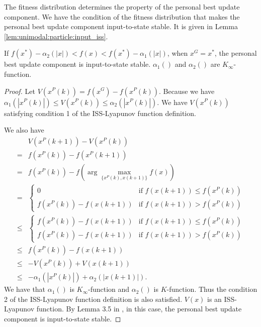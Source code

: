 The fitness distribution determines the property of the personal best update component.
We have the condition of the fitness distribution that makes the personal best update component input-to-state stable.
It is given in Lemma \ref{lem:unimodal:particle:input_iss}.

\begin{mylem}
\label{lem:unimodal:particle:input_iss}
If $ f(x^{*}) - \alpha_{2} ( |x| ) <  f(x) < f(x^{*}) - \alpha_{1} ( |x| ) $, when $ x^{G} = x^{*} $, the personal best update component is input-to-state stable.
$ \alpha_{1} () $ and $ \alpha_{2} () $ are $ K_{\infty} $-function.
\begin{proof}
Let $ V(x^{P}(k)) = f(x^{G}) - f(x^{P}(k)) $.
Because we have
$ \alpha_{1} ( |x^{P}(k)| ) \leq V( x^{P}(k) ) \leq \alpha_{2} ( |x^{P}(k)| )  $.
We have $ V ( x^{P}(k) ) $ satisfying condition 1 of the ISS-Lyapunov function definition.

We also have
\begin{equation}
\begin{aligned}
& V(x^{P}(k+1)) - V(x^{P}(k)) \\
= & f(x^{P} (k)) - f(x^{P} (k+1)) \\
= & f(x^{P}(k)) - f( \arg \max_{ \{ x^{P}(k), x(k+1)  \} } f(x) )  \\
= & 
\left\{\begin{matrix}
0  & \mbox{if } f(x(k+1)) \leq f(x^{P}(k)) \\ 
f(x^{P}(k)) - f(x(k+1)) & \mbox{if } f(x(k+1)) > f(x^{P}(k))
\end{matrix}\right. \\
\leq & 
\left\{\begin{matrix}
f(x^{P}(k)) - f(x(k+1))  & \mbox{if } f(x(k+1)) \leq f(x^{P}(k)) \\ 
f(x^{P}(k)) - f(x(k+1)) & \mbox{if } f(x(k+1)) > f(x^{P}(k))
\end{matrix}\right. \\
\leq & f(x^{P}(k)) - f(x(k+1)) \\
\leq & - V(x^{P}(k)) + V(x(k+1)) \\
\leq & - \alpha_{1} ( | x^{P}(k) | ) + \alpha_{2} ( | x(k+1) | ).
\end{aligned}
\end{equation} 
We have that $ \alpha_{1} () $ is $ K_{\infty} $-function and $ \alpha_{2} () $ is $ K $-function.
Thus the condition 2 of the ISS-Lyapunov function definition is also satisfied.
$ V(x) $ is an ISS-Lyapunov function.
By Lemma 3.5 in \cite{Jiang2001857}, in this case, the personal best update component is input-to-state stable.
\end{proof}
\end{mylem}


